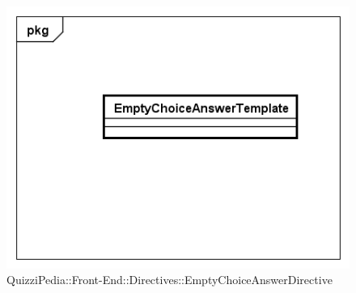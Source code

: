 		\label{QuizziPedia::Front-End::Directives::EmptySpaceAnswerDirective}
		
		\begin{figure}[ht]
			\centering
			\includegraphics[scale=0.5,keepaspectratio]{UML/Classi/Front-End/QuizziPedia_Front-end_Templates_EmptySpaceAnswerTemplate.png}
			\caption{QuizziPedia::Front-End::Directives::EmptyChoiceAnswerDirective}
		\end{figure} \FloatBarrier
		

